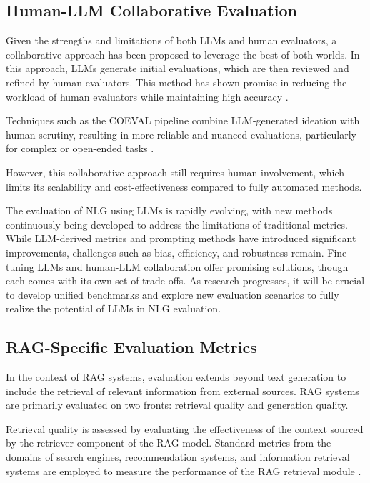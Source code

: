 \subsection{Human-LLM Collaborative Evaluation}

Given the strengths and limitations of both LLMs and human evaluators, a collaborative approach has been proposed to leverage the best of both worlds. In this approach, LLMs generate initial evaluations, which are then reviewed and refined by human evaluators. This method has shown promise in reducing the workload of human evaluators while maintaining high accuracy \cite{li2023collaborative}.

Techniques such as the COEVAL pipeline combine LLM-generated ideation with human scrutiny, resulting in more reliable and nuanced evaluations, particularly for complex or open-ended tasks \cite{zhang2021human}.

However, this collaborative approach still requires human involvement, which limits its scalability and cost-effectiveness compared to fully automated methods.

\newline

The evaluation of NLG using LLMs is rapidly evolving, with new methods continuously being developed to address the limitations of traditional metrics. While LLM-derived metrics and prompting methods have introduced significant improvements, challenges such as bias, efficiency, and robustness remain. Fine-tuning LLMs and human-LLM collaboration offer promising solutions, though each comes with its own set of trade-offs. As research progresses, it will be crucial to develop unified benchmarks and explore new evaluation scenarios to fully realize the potential of LLMs in NLG evaluation.

\subsection{RAG-Specific Evaluation Metrics}

In the context of RAG systems, evaluation extends beyond text generation to include the retrieval of relevant information from external sources. RAG systems are primarily evaluated on two fronts: retrieval quality and generation quality.

Retrieval quality is assessed by evaluating the effectiveness of the context sourced by the retriever component of the RAG model. Standard metrics from the domains of search engines, recommendation systems, and information retrieval systems are employed to measure the performance of the RAG retrieval module \cite{chakrabarti2003mining}.

